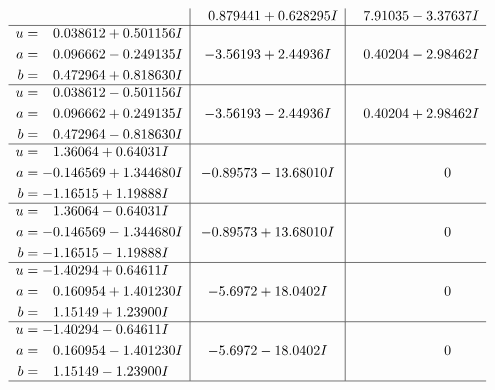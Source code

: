 \documentclass[1p]{elsarticle_modified}
\theoremstyle{definition}
\begin{document}
$$\begin{array}{c|c|c}
 & \phantom{-}0.879441 + 0.628295 I & \phantom{-}7.91035 - 3.37637 I \\ \hline\begin{aligned}
u &= \phantom{-}0.038612 + 0.501156 I \\
a &= \phantom{-}0.096662 - 0.249135 I \\
b &= \phantom{-}0.472964 + 0.818630 I\end{aligned}
 & -3.56193 + 2.44936 I & \phantom{-}0.40204 - 2.98462 I \\ \hline\begin{aligned}
u &= \phantom{-}0.038612 - 0.501156 I \\
a &= \phantom{-}0.096662 + 0.249135 I \\
b &= \phantom{-}0.472964 - 0.818630 I\end{aligned}
 & -3.56193 - 2.44936 I & \phantom{-}0.40204 + 2.98462 I \\ \hline\begin{aligned}
u &= \phantom{-}1.36064 + 0.64031 I \\
a &= -0.146569 + 1.344680 I \\
b &= -1.16515 + 1.19888 I\end{aligned}
 & -0.89573 - 13.68010 I & \phantom{-0.000000 } 0 \\ \hline\begin{aligned}
u &= \phantom{-}1.36064 - 0.64031 I \\
a &= -0.146569 - 1.344680 I \\
b &= -1.16515 - 1.19888 I\end{aligned}
 & -0.89573 + 13.68010 I & \phantom{-0.000000 } 0 \\ \hline\begin{aligned}
u &= -1.40294 + 0.64611 I \\
a &= \phantom{-}0.160954 + 1.401230 I \\
b &= \phantom{-}1.15149 + 1.23900 I\end{aligned}
 & -5.6972 + 18.0402 I & \phantom{-0.000000 } 0 \\ \hline\begin{aligned}
u &= -1.40294 - 0.64611 I \\
a &= \phantom{-}0.160954 - 1.401230 I \\
b &= \phantom{-}1.15149 - 1.23900 I\end{aligned}
 & -5.6972 - 18.0402 I & \phantom{-0.000000 } 0\\
 \hline 
 \end{array}$$\newpage\newpage\renewcommand{\arraystretch}{1}
\end{document}
